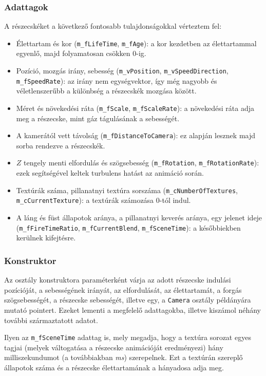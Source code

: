 \subsubsection{Adattagok}
A részecskéket a következő fontosabb tulajdonságokkal vérteztem fel:
\begin{itemize}
\item Élettartam és kor (\texttt{m\_fLifeTime}, \texttt{m\_fAge}): a kor kezdetben az élettartammal egyenlő, majd folyamatosan csökken $0$-ig.
\item Pozíció, mozgás irány, sebesség (\texttt{m\_vPosition}, \texttt{m\_vSpeedDirection}, \texttt{m\_fSpeedRate}): az irány nem egységvektor, így még nagyobb és véletlenszerűbb a különbség a részecskék mozgása között.
\item Méret és növekedési ráta (\texttt{m\_fScale}, \texttt{m\_fScaleRate}): a növekedési ráta adja meg a részecske, mint gáz tágulásának a sebességét.
\item A kamerától vett távolság (\texttt{m\_fDistanceToCamera}): ez alapján lesznek majd sorba rendezve a részecskék.
\item $Z$ tengely menti elfordulás és szögsebesség (\texttt{m\_fRotation}, \texttt{m\_fRotationRate}): ezek segítségével keltek turbulens hatást az animáció során.
\item Textúrák száma, pillanatnyi textúra sorszáma (\texttt{m\_cNumberOfTextures}, \\ \texttt{m\_cCurrentTexture}): a textúrák számozása $0$-tól indul.
\item A láng és füst állapotok aránya, a pillanatnyi keverés aránya, egy jelenet ideje (\texttt{m\_fFireTimeRatio}, \texttt{m\_fCurrentBlend}, \texttt{m\_fSceneTime}): a későbbiekben kerülnek kifejtésre.
\end{itemize}

\subsubsection{Konstruktor}
Az osztály konstruktora paraméterként várja az adott részecske indulási pozícióját, a sebességének irányát, az elfordulását, az élettartamát, a forgás szögsebességét, a részecske sebességét, illetve egy, a \texttt{Camera} osztály példányára mutató pointert. Ezeket lementi a megfelelő adattagokba, illetve kiszámol néhány további származtatott adatot. 

Ilyen az \texttt{m\_fSceneTime} adattag is, mely megadja, hogy a textúra sorozat egyes tagjai (melyek váltogatása a részecske animációját eredményezi) hány milliszekundumot (a továbbiakban \textit{ms}) szerepelnek. Ezt a textúrán szereplő állapotok száma és a részecske élettartamának a hányadosa adja meg. 

